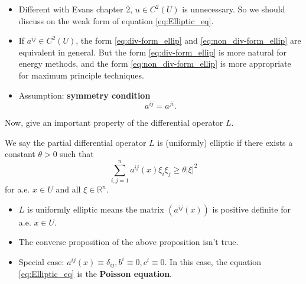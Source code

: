 \begin{remark}
    \begin{itemize}
        \item Different with Evans chapter 2, $u\in C^{2}(U)$ is unnecessary. So we should discuss on the weak form of equation \eqref{eq:Elliptic_eq}.
        \item If $a^{ij}\in C^{2}(U)$, the form \eqref{eq:div-form_ellip} and \eqref{eq:non_div-form_ellip} are equivalent in general. But the form \eqref{eq:div-form_ellip} is more natural for energy methods, and the form \eqref{eq:non_div-form_ellip} is more appropriate for maximum principle techniques.
        \item Assumption: \textbf{symmetry condition}
        \begin{equation*}
            \label{eq:symmetry_cond}
            a^{ij}=a^{ji}.
        \end{equation*}
    \end{itemize}
\end{remark}
Now, give an important property of the differential operator $L$.
\begin{definition}
    \label{defn:uniformly_elliptic}
    We say the partial differential operator $L$ is (uniformly) elliptic if there exists a constant $\theta>0$ such that
    \begin{equation}
        \sum_{i,j=1}^{n}a^{ij}(x)\xi_{i}\xi_{j}\ge\theta |\xi|^{2}
    \end{equation}
    for a.e. $x\in U$ and all $\xi\in\mathbb{R}^{n}$.
\end{definition}

\begin{remark}
    \begin{itemize}
        \item $L$ is uniformly elliptic means the matrix $(a^{ij}(x))$ is positive definite for a.e. $x\in U$.
        \item The converse proposition of the above proposition isn't true.
        \item Special case: $a^{ij}(x)\equiv\delta_{ij}, b^{i}\equiv 0, c^{i}\equiv 0$. In this case, the equation \eqref{eq:Elliptic_eq} is the \textbf{Poisson equation}.
    \end{itemize}
\end{remark}
